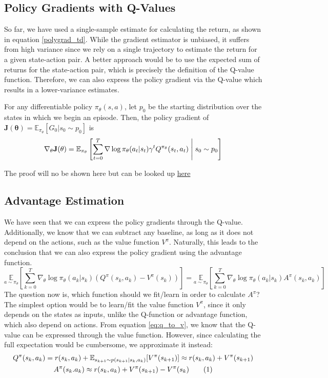 \subsection{Policy Gradients with Q-Values}
So far, we have used a single-sample estimate for calculating the return, 
as shown in equation \eqref{polygrad_td}. While the gradient estimator is unbiased, it suffers 
from high variance since we rely on a single trajectory to estimate the return for a given
state-action pair. A better approach would be to use the expected sum of returns for the 
state-action pair, which is precisely the definition of the Q-value function. Therefore, we
can also express the policy gradient via the Q-value which results in a lower-variance estimates.
\begin{theorem}
    For any differentiable policy $\pi_{\theta}(s,a)$, let $p_0$ be the starting distribution 
    over the states in which we begin an episode. Then, the policy gradient of 
    ${\mathbf{J(\theta)}= \mathbb{E}_{\pi_{\theta}}[G_0|s_0 \sim p_0]}$ is
    \begin{align*}
        \mathbf{\nabla_{\theta} J (\theta)} = \mathbb{E}_{\pi_{\theta}}
        \left[\sum_{t=0}^{T} 
        \nabla\log{\pi_{\theta}(a_t|s_t)} \gamma^t Q^{\pi_{\theta}}(s_t,a_t) \;\middle|\; s_0 \sim p_0\right]
    \end{align*}
\end{theorem}
The proof will no be shown here but can be looked up \href{https://youtu.be/y3oqOjHilio?si=XjzPBM-osI8y3C6_&t=3029}{here}

\subsection{Advantage Estimation}
We have seen that we can express the policy gradients through the Q-value. Additionally, we know that we
can subtract any baseline, as long as it does not depend on the actions, such as the value function $V^\pi$.
Naturally, this leads to the conclusion that we can also express the policy gradient using the advantage function.
$$ \underset{a\sim\pi_\theta}{\mathbb{E}}\left[\sum_{k=0}^{T} \nabla_{\theta}\log{\pi_{\theta} (a_k|s_k) 
   \left(Q^\pi(s_k,a_k) - V^\pi(s_k)\right)}\right] = 
    \underset{a\sim\pi_\theta}{\mathbb{E}}\left[\sum_{k=0}^{T} \nabla_{\theta}\log{\pi_{\theta} (a_k|s_k)} A^\pi(s_k,a_k) \right]$$
The question now is, which function should we fit/learn in order to calculate $A^\pi$? The simplest option would be to 
learn/fit the value function $V^\pi$, since it only depends on the states as inputs, unlike the Q-function or advantage
function, which also depend on actions. From equation \eqref{eq:q_to_v}, we know that the Q-value can be expressed through 
the value function. However, since calculating the full expectation would be cumbersome, we approximate it instead:
\begin{gather*}
    Q^\pi(s_k,a_k) = r(s_k,a_k)+ \mathbb{E}_{s_{k+1}\sim p(s_{k+1}|s_k,a_k)}[V^\pi(s_{k+1})] \approx r(s_k,a_k)+V^\pi(s_{k+1})\\
    A^\pi(s_k.a_k) \approx r(s_k,a_k)+V^\pi(s_{k+1}) - V^\pi(s_{k}) \numberthis \label{eq:adv_1_step}
\end{gather*}
